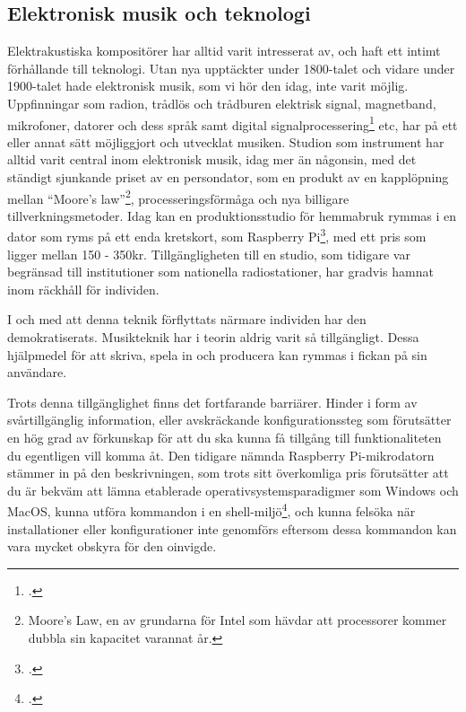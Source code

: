 \documentclass{article}
\begin{document}

\subsection{Elektronisk musik och teknologi}
Elektrakustiska kompositörer har alltid varit intresserat av, och haft ett intimt förhållande till teknologi.
Utan nya upptäckter under 1800-talet och vidare under 1900-talet hade elektronisk musik, som vi hör den idag,
inte varit möjlig. Uppfinningar som radion, trådlös och trådburen elektrisk signal, magnetband, mikrofoner,
datorer och dess språk samt digital signalprocessering\footcite[1-5]{dsp} etc, har på ett eller annat sätt
möjliggjort och utvecklat musiken. Studion som instrument har alltid varit central inom elektronisk musik,
idag mer än någonsin, med det ständigt sjunkande priset av en persondator, som en produkt av en
kapplöpning mellan ``Moore's law''\footnote{Moore's Law, en av grundarna för Intel som hävdar att processorer
kommer dubbla sin kapacitet varannat år.}, processeringsförmåga och nya billigare tillverkningsmetoder. Idag
kan en produktionsstudio för hemmabruk rymmas i en dator som ryms på ett enda kretskort, som Raspberry
Pi\footcite{rpi}, med ett pris som ligger mellan 150 - 350kr. Tillgängligheten till en studio, som tidigare
var begränsad till institutioner som nationella radiostationer, har gradvis hamnat inom räckhåll för
individen.

I och med att denna teknik förflyttats närmare individen har den demokratiserats. Musikteknik har i teorin
aldrig varit så tillgängligt. Dessa hjälpmedel för att skriva, spela in och producera kan rymmas i
fickan på sin användare.

Trots denna tillgänglighet finns det fortfarande barriärer. Hinder i form av svårtillgänglig information,
eller avskräckande konfigurationssteg som förutsätter en hög grad av förkunskap för att du ska kunna få
tillgång till funktionaliteten du egentligen vill komma åt. Den tidigare nämnda Raspberry Pi-mikrodatorn
stämmer in på den beskrivningen, som trots sitt överkomliga pris förutsätter att du är bekväm att lämna
etablerade operativsystemsparadigmer som Windows och MacOS, kunna utföra kommandon i en
shell-miljö\footcite{unix}, och kunna felsöka när installationer eller konfigurationer inte genomförs
eftersom dessa kommandon kan vara mycket obskyra för den oinvigde.
	
\end{document}
